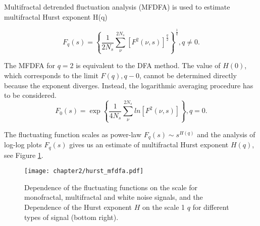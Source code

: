 

Multifractal detrended fluctuation analysis (MFDFA) is used \cite{kantelhardt2002, ihlen2012} to estimate multifractal Hurst exponent H(q) 

\begin{equation}
F_q(s) = \left\{\frac{1}{2N_s}\sum_{\nu}^{2N_s}\left[F^2(\nu, s)\right]^{\frac{q}{2}}\right\}^{\frac{1}{q}},  q \neq 0 \nonumber.
\end{equation}

The MFDFA for $q=2$ is equivalent to the DFA method. The value of $H(0)$, which corresponds to the limit $F(q), q-0$, cannot be determined directly because the exponent diverges. Instead, the logarithmic averaging procedure has to be considered. 
\begin{equation}
F_0(s) = \exp \left\{\frac{1}{4N_s}\sum_{\nu}^{2N_s}ln \left[F^2(\nu, s)\right]\right\}, q=0.
\end{equation}

The fluctuating function scales as power-law $F_q(s) \sim s^{H(q)}$ and the analysis of log-log plots $F_q(s)$ gives us an estimate of multifractal Hurst exponent $H(q)$, see Figure \ref{fig:hurst_mfdfa}.

\begin{figure}[H]
	\centering
	\texttt{[image: chapter2/hurst\_mfdfa.pdf]}
	\caption[Fluctuating function and Hurst exponent.]{Dependence of the fluctuating functions on the scale for monofractal, multifractal and white noise signals, and the Dependence of the Hurst exponent $H$ on the scale 1 $q$ for different types of signal (bottom right).}
	\label{fig:hurst_mfdfa}
\end{figure}

